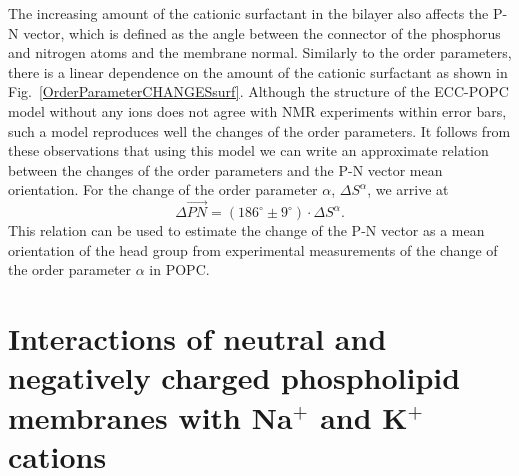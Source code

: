 The increasing amount of the cationic surfactant in the bilayer
also affects the P-N vector, 
which is defined as the angle between the connector of the phosphorus and nitrogen atoms and the membrane normal. 
Similarly to the order parameters, 
there is a linear dependence on the amount of the cationic surfactant
as shown in Fig.~\ref{OrderParameterCHANGESsurf}. 
Although the structure of the ECC-POPC model without any ions does not agree with NMR experiments within error bars,
such a model reproduces well the changes of the order parameters.
It follows from these observations that using this model
we can write an approximate relation between the changes of the order parameters and the P-N vector mean orientation. 
For the change of the order parameter $\alpha$, $\Delta S^\alpha$, we arrive at
\begin{equation}
\Delta \vec{PN} = (186^\circ \pm 9^\circ) \cdot \Delta S^\alpha .
\end{equation}
This relation can be used to estimate the change of the P-N vector as a mean orientation of the head group
from experimental measurements of the change of the order parameter $\alpha$ in POPC. 













\section{Interactions of neutral and negatively charged phospholipid membranes with Na$^+$ and K$^+$ cations}
\label{section:lip-ion_k_na}

